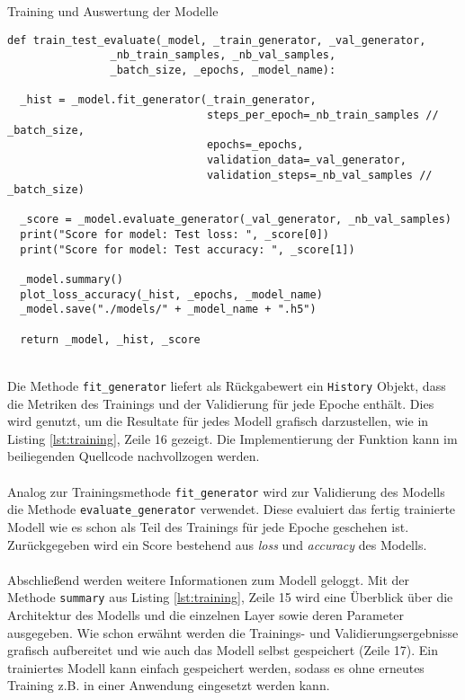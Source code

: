 \begin{listing} [ht]
	\caption{Training und Auswertung der Modelle}
	\label{lst:training}
	\begin{verbatim}
def train_test_evaluate(_model, _train_generator, _val_generator,
				_nb_train_samples, _nb_val_samples,
				_batch_size, _epochs, _model_name):
	
  _hist = _model.fit_generator(_train_generator,
                               steps_per_epoch=_nb_train_samples // _batch_size,
                               epochs=_epochs,
                               validation_data=_val_generator,
                               validation_steps=_nb_val_samples // _batch_size)
	
  _score = _model.evaluate_generator(_val_generator, _nb_val_samples)
  print("Score for model: Test loss: ", _score[0])
  print("Score for model: Test accuracy: ", _score[1])
	
  _model.summary()
  plot_loss_accuracy(_hist, _epochs, _model_name)
  _model.save("./models/" + _model_name + ".h5")
	
  return _model, _hist, _score
	\end{verbatim}
\end{listing} \ \\
%
Die Methode \texttt{fit\_generator} liefert als Rückgabewert ein \texttt{History} Objekt, dass die Metriken des Trainings und der Validierung für jede Epoche enthält. Dies wird genutzt, um die Resultate für jedes Modell grafisch darzustellen, wie in Listing \ref{lst:training}, Zeile 16 gezeigt. Die Implementierung der Funktion kann im beiliegenden Quellcode nachvollzogen werden. \\
\\
Analog zur Trainingsmethode \texttt{fit\_generator} wird zur Validierung des Modells die Methode \texttt{evaluate\_generator} verwendet. Diese evaluiert das fertig trainierte Modell wie es schon als Teil des Trainings für jede Epoche geschehen ist. Zurückgegeben wird ein Score bestehend aus \textit{loss} und \textit{accuracy} des Modells. \\ 
\\
Abschließend werden weitere Informationen zum Modell geloggt. Mit der Methode \texttt{summary} aus Listing \ref{lst:training}, Zeile 15 wird eine Überblick über die Architektur des Modells und die einzelnen Layer sowie deren Parameter ausgegeben. Wie schon erwähnt werden die Trainings- und Validierungsergebnisse grafisch aufbereitet und wie auch das Modell selbst gespeichert (Zeile 17). Ein trainiertes Modell kann einfach gespeichert werden, sodass es ohne erneutes Training z.B. in einer Anwendung eingesetzt werden kann. \\
\\


